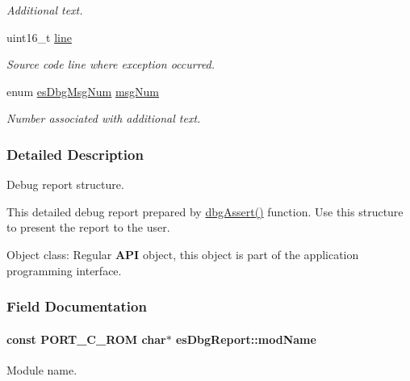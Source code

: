 \begin{DoxyCompactItemize}
\begin{DoxyCompactList}\small\item\em Additional text. \end{DoxyCompactList}\item 
uint16\-\_\-t \hyperlink{structesDbgReport_a98cc5a9cbc3df997fa991aa2fa7cf8f0}{line}
\begin{DoxyCompactList}\small\item\em Source code line where exception occurred. \end{DoxyCompactList}\item 
enum \hyperlink{group__dbg__intf_ga4609b307edd90e35a1b5f8f6e7923e92}{es\-Dbg\-Msg\-Num} \hyperlink{structesDbgReport_a4f414a29ac5524b5d6ed12bf83189f1d}{msg\-Num}
\begin{DoxyCompactList}\small\item\em Number associated with additional text. \end{DoxyCompactList}\end{DoxyCompactItemize}


\subsubsection{Detailed Description}
Debug report structure. 

This detailed debug report prepared by \hyperlink{group__dbg__intf_ga736bb1b558e8daecde7534dad729f53b}{dbg\-Assert()} function. Use this structure to present the report to the user. \begin{DoxyParagraph}{Object class\-:}
Regular {\bfseries A\-P\-I} object, this object is part of the application programming interface. 
\end{DoxyParagraph}


\subsubsection{Field Documentation}
\hypertarget{structesDbgReport_a36408531293748b90f8dff6450221f8e}{
\paragraph[{mod\-Name}]{\setlength{\rightskip}{0pt plus 5cm}const P\-O\-R\-T\-\_\-\-C\-\_\-\-R\-O\-M char$\ast$ es\-Dbg\-Report\-::mod\-Name}}\label{structesDbgReport_a36408531293748b90f8dff6450221f8e}


Module name. 

